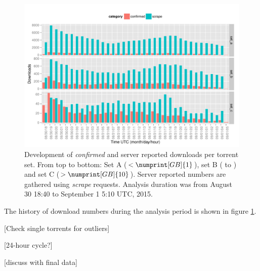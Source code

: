 \documentclass[10pt, a4paper, twoside, headsepline]{scrbook}
\renewcommand{\_}{\origunderscore\allowbreak}
\newcommand{\range}{from August 30 18:40 to September 1 5:10 UTC, 2015}
\begin{document}
\begin{figure}
\centering
\includegraphics[width=\textwidth]{../result/2015-08-30_20-combined_download_set}
\caption[Development of confirmed and reported downloads per torrent set]{Development of \emph{confirmed} and server reported downloads per torrent set. From top to bottom: Set A ($<\numprint[GB]{1}$), set B ( to ) and set C ($>\numprint[GB]{10}$). Server reported numbers are gathered using \emph{scrape} requests. Analysis duration was \range.}
\label{download-history}
\end{figure}

The history of download numbers during the analysis period is shown in figure \ref{download-history}.

[Check single torrents for outliers]

[24-hour cycle?]

[discuss with final data]
\end{document}
